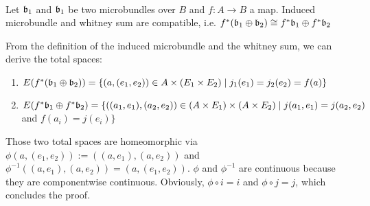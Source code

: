  \\
Let $\mathfrak{b}_1$ and $\mathfrak{b}_1$ be two microbundles over $B$ and $f: A \to B$ a map.
Induced microbundle and whitney sum are compatible, i.e. $f^*(\mathfrak{b}_1 \oplus \mathfrak{b}_2) \cong f^*\mathfrak{b}_1 \oplus f^*\mathfrak{b}_2$
\begin{myproof}
From the definition of the induced microbundle and the whitney sum, we can derive the total spaces:
\begin{enumerate}
    \item $E(f^*(\mathfrak{b}_1 \oplus \mathfrak{b}_2)) = \{(a, (e_1, e_2)) \in A \times (E_1 \times E_2) \mid j_1(e_1) = j_2(e_2) = f(a) \}$
    \item $E(f^*\mathfrak{b}_1 \oplus f^*\mathfrak{b}_2) = \{((a_1, e_1), (a_2, e_2)) \in (A \times E_1) \times (A \times E_2) \mid j(a_1, e_1) = j(a_2, e_2)$ and $f(a_i) = j(e_i)\}$
\end{enumerate}
Those two total spaces are homeomorphic via $\phi(a, (e_1, e_2)) := ((a, e_1), (a, e_2))$ and
$\phi^{-1}((a, e_1), (a, e_2)) = (a, (e_1, e_2))$. $\phi$ and $\phi^{-1}$ are continuous because they are componentwise continuous.
Obviously, $\phi \circ i = i$ and $\phi \circ j = j$, which concludes the proof. 
\end{myproof}